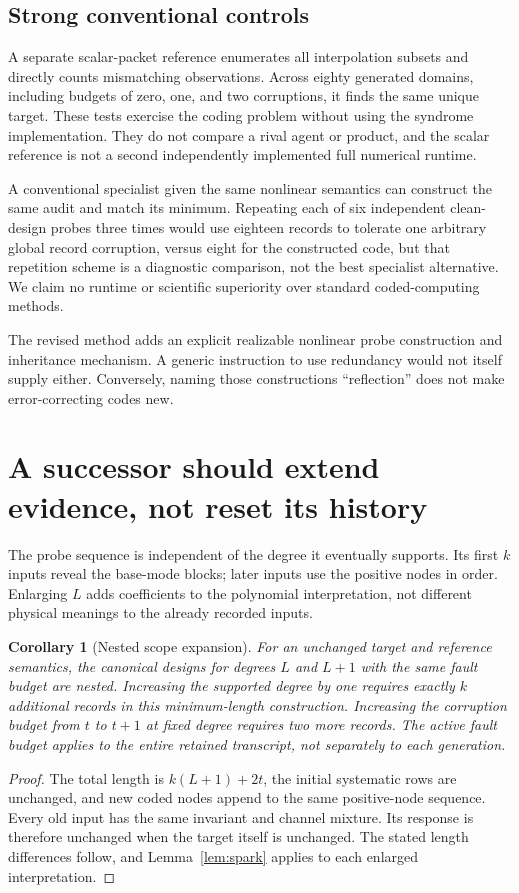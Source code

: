 \documentclass[11pt,letterpaper]{article}
\newtheorem{corollary}{Corollary}[section]
\theoremstyle{remark}\newtheorem{remark}{Remark}[section]
\begin{document}
\subsection{Strong conventional controls}
A separate scalar-packet reference enumerates all interpolation subsets and directly counts mismatching observations. Across eighty generated domains, including budgets of zero, one, and two corruptions, it finds the same unique target. These tests exercise the coding problem without using the syndrome implementation. They do not compare a rival agent or product, and the scalar reference is not a second independently implemented full numerical runtime.

A conventional specialist given the same nonlinear semantics can construct the same audit and match its minimum. Repeating each of six independent clean-design probes three times would use eighteen records to tolerate one arbitrary global record corruption, versus eight for the constructed code, but that repetition scheme is a diagnostic comparison, not the best specialist alternative. We claim no runtime or scientific superiority over standard coded-computing methods.

The revised method adds an explicit realizable nonlinear probe construction and inheritance mechanism. A generic instruction to use redundancy would not itself supply either. Conversely, naming those constructions ``reflection'' does not make error-correcting codes new.

\section{A successor should extend evidence, not reset its history}
\label{sec:successor}
The probe sequence is independent of the degree it eventually supports. Its first $k$ inputs reveal the base-mode blocks; later inputs use the positive nodes in order. Enlarging $L$ adds coefficients to the polynomial interpretation, not different physical meanings to the already recorded inputs.

\begin{corollary}[Nested scope expansion]\label{cor:inherit}
For an unchanged target and reference semantics, the canonical designs for degrees $L$ and $L+1$ with the same fault budget are nested. Increasing the supported degree by one requires exactly $k$ additional records in this minimum-length construction. Increasing the corruption budget from $t$ to $t+1$ at fixed degree requires two more records. The active fault budget applies to the entire retained transcript, not separately to each generation.
\end{corollary}
\begin{proof}
The total length is $k(L+1)+2t$, the initial systematic rows are unchanged, and new coded nodes append to the same positive-node sequence. Every old input has the same invariant and channel mixture. Its response is therefore unchanged when the target itself is unchanged. The stated length differences follow, and Lemma~\ref{lem:spark} applies to each enlarged interpretation.
\end{proof}
\end{document}
